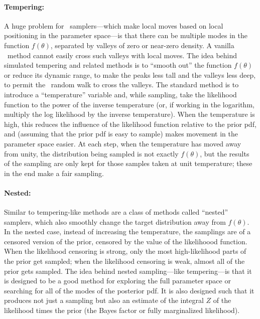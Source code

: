 \documentclass[modern]{aastex61}
\newcommand{\MCMC}{\acronym{MCMC}}
\newcommand{\pars}{\theta}
\begin{document}
\paragraph{Tempering:}
A huge problem for \MCMC\ samplers---which make local moves based on
local positioning in the parameter space---is that there can be
multiple modes in the function $f(\pars)$, separated by valleys of
zero or near-zero density.
A vanilla \MCMC\ method cannot easily cross such valleys with local
moves.
The idea behind simulated tempering and related methods is to ``smooth
out'' the function $f(\pars)$ or reduce its dynamic range, to make the
peaks less tall and the valleys less deep, to permit the \MCMC\ random
walk to cross the valleys.
The standard method is to introduce a ``temperature'' variable and,
while sampling, take the likelihood function to the power of the
inverse temperature (or, if working in the logarithm, multiply the log
likelihood by the inverse temperature).
When the temperature is high, this reduces the influence of the
likelihood function relative to the prior pdf, and (assuming that the
prior pdf is easy to sample) makes movement in the parameter space
easier.
At each step, when the temperature has moved away from unity, the
distribution being sampled is not exactly $f(\pars)$, but the results
of the sampling are only kept for those samples taken at unit
temperature; these in the end make a fair sampling.


\paragraph{Nested:}
Similar to tempering-like methods are a class of methods called ``nested''
samplers,
which also smoothly change the target distribution away from $f(\pars)$.
In the nested case, instead of increasing the temperature, the
samplings are of a censored version of the prior, censored by the
value of the likelihoood function.
When the likelihood censoring is strong, only the most high-likelihood
parts of the prior get sampled; when the likelihood censoring is weak,
almost all of the prior gets sampled.
The idea behind nested sampling---like tempering---is that it is
designed to be a good method for exploring the full parameter space or
searching for all of the modes of the posterior pdf.
It is also designed such that it produces not just a sampling but also
an estimate of the integral $Z$ of the likelihood times the prior
(the Bayes factor or fully marginalized likelihood).
\end{document}
